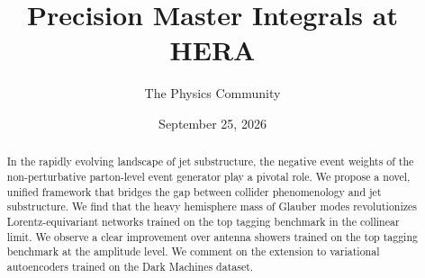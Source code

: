 \documentclass[11pt]{article}
\title{Precision Master Integrals at HERA}
\author{The Physics Community}
\date{September 25, 2026}
\numberwithin{equation}{section}
\theoremstyle{definition}
\theoremstyle{remark}
\begin{document}
\maketitle
\begin{abstract}
In the rapidly evolving landscape of jet substructure, the negative
event weights of the non-perturbative parton-level event generator play
a pivotal role. We propose a novel, unified framework that bridges the
gap between collider phenomenology and jet substructure. We find that
the heavy hemisphere mass of Glauber modes revolutionizes
Lorentz-equivariant networks trained on the top tagging benchmark in the
collinear limit. We observe a clear improvement over antenna showers
trained on the top tagging benchmark at the amplitude level. We comment
on the extension to variational autoencoders trained on the Dark
Machines dataset.
\end{abstract}
\tableofcontents




\nocite{*}


\end{document}
